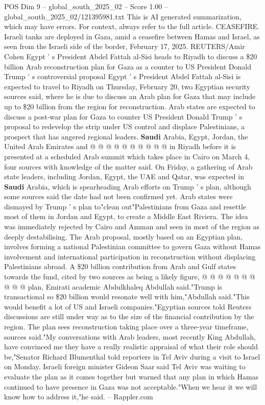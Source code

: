 \begin{textsample}{POS Dim 9 – global\_south\_2025\_02 – Score 1.00 – global\_south\_2025\_02/121395981.txt}  \label{ex:f9_pos_263}
This is AI generated summarization, which may have errors.
For context, always refer to the full article.
CEASEFIRE.
Israeli tanks are deployed in Gaza, amid a ceasefire between Hamas and Israel, as seen from the Israeli side of the border, February 17, 2025.
REUTERS/Amir Cohen Egypt ' s President Abdel Fattah al-Sisi heads to Riyadh to discuss a \$20 billion Arab reconstruction plan for Gaza as a counter to US President Donald Trump ' s controversial proposal Egypt ' s President Abdel Fattah al-Sisi is expected to travel to Riyadh on Thursday, February 20, two Egyptian security sources said, where he is due to discuss an Arab plan for Gaza that may include up to \$20 billion from the region for reconstruction.
Arab states are expected to discuss a post-war plan for Gaza to counter US President Donald Trump ' s proposal to redevelop the strip under US control and displace Palestinians, a prospect that has angered regional leaders. \textbf{Saudi} Arabia, Egypt, Jordan, the United Arab Emirates and @ @ @ @ @ @ @ @ @ @ in Riyadh before it is presented at a scheduled Arab summit which takes place in Cairo on March 4, four sources with knowledge of the matter said.
On Friday, a gathering of Arab state leaders, including Jordan, Egypt, the UAE and Qatar, was expected in \textbf{Saudi} Arabia, which is spearheading Arab efforts on Trump ' s plan, although some sources said the date had not been confirmed yet.
Arab states were dismayed by Trump ' s plan to"clean out"Palestinians from Gaza and resettle most of them in Jordan and Egypt, to create a Middle East Riviera.
The idea was immediately rejected by Cairo and Amman and seen in most of the region as deeply destabilising.
The Arab proposal, mostly based on an Egyptian plan, involves forming a national Palestinian committee to govern Gaza without Hamas involvement and international participation in reconstruction without displacing Palestinians abroad.
A \$20 billion contribution from Arab and Gulf states towards the fund, cited by two sources as being a likely figure, @ @ @ @ @ @ @ @ @ @ plan, Emirati academic Abdulkhaleq Abdullah said."Trump is transactional so \$20 billion would resonate well with him,"Abdullah said."This would benefit a lot of US and Israeli companies."Egyptian sources told Reuters discussions are still under way as to the size of the financial contribution by the region.
The plan sees reconstruction taking place over a three-year timeframe, sources said."My conversations with Arab leaders, most recently King Abdullah, have convinced me they have a really realistic appraisal of what their role should be,"Senator Richard Blumenthal told reporters in Tel Aviv during a visit to Israel on Monday.
Israeli foreign minister Gideon Saar said Tel Aviv was waiting to evaluate the plan as it comes together but warned that any plan in which Hamas continued to have presence in Gaza was not acceptable."When we hear it we will know how to address it,"he said. -- Rappler.com

\end{textsample}

